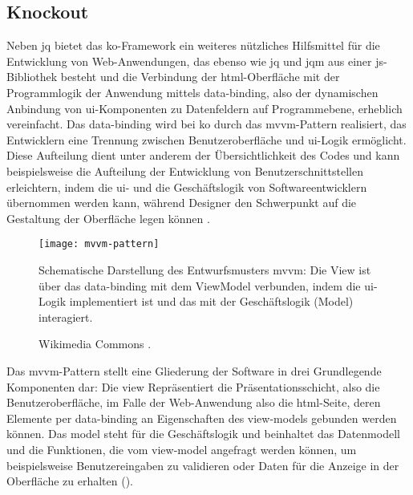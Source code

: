 \par\noindent\begin{minipage}{\linewidth}

\end{minipage}\par\addvspace{\topskip}
	
\subsection{Knockout}  \label{ko}

Neben \gls{jq} bietet das \gls{ko}-Framework ein weiteres nützliches Hilfsmittel für die Entwicklung von Web-Anwendungen, das ebenso wie \gls{jq} und \gls{jqm} aus einer \gls{js}-Bibliothek besteht und die Verbindung der \gls{html}-Oberfläche mit der Programmlogik der Anwendung mittels \gls{data-binding}, also der dynamischen Anbindung von \gls{ui}-Komponenten zu Datenfeldern auf Programmebene, erheblich vereinfacht.
Das \gls{data-binding} wird bei \gls{ko} durch das \gls{mvvm}-Pattern realisiert, das Entwicklern eine Trennung zwischen Benutzeroberfläche und \gls{ui}-Logik ermöglicht.
Diese Aufteilung dient unter anderem der Übersichtlichkeit des Codes und kann beispielsweise die Aufteilung der Entwicklung von Benutzerschnittstellen erleichtern, indem die \gls{ui}- und die Geschäftslogik von Softwareentwicklern übernommen werden kann, während Designer den Schwerpunkt auf die Gestaltung der Oberfläche legen können \cite{Model_View_ViewModel__Wikipedia}.

\begin{figure}[h!]
\centering
\texttt{[image: mvvm-pattern]}
\caption[\gls{mvvm}-Pattern]{Schematische Darstellung des Entwurfsmusters \gls{mvvm}: Die View ist über das \gls{data-binding} mit dem ViewModel verbunden, indem die \gls{ui}-Logik implementiert ist und das mit der Geschäftslogik (Model) interagiert.}
\label{fig:mvvm-pattern}
	\imagesourcefont
	\vspace{\imagesourcespace}
	\imagesourcefont{}
	\caption*{\imagesourcelabel Wikimedia Commons \cite{MVVMPattern}.}
\end{figure}

Das \gls{mvvm}-Pattern stellt eine Gliederung der Software in drei Grundlegende Komponenten dar:
Die \gls{view} Repräsentiert die Präsentationsschicht, also die Benutzeroberfläche, im Falle der Web-Anwendung also die \gls{html}-Seite, deren Elemente per \gls{data-binding} an Eigenschaften des \glspl{view-model} gebunden werden können. 
Das \gls{model} steht für die Geschäftslogik und beinhaltet das Datenmodell und die Funktionen, die vom \gls{view-model} angefragt werden können, um beispielsweise Benutzereingaben zu validieren oder Daten für die Anzeige in der Oberfläche zu erhalten ().

